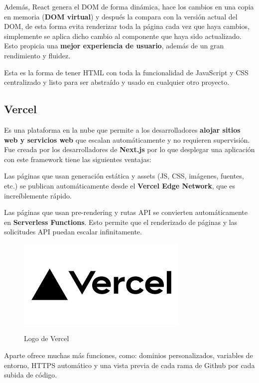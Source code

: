 \documentclass[12pt,twoside,titlepage]{report}
\begin{document}
Además, React genera el DOM de forma dinámica, hace los cambios en una copia en memoria (\textbf{DOM virtual}) y después la compara con la versión actual del DOM, de esta forma evita renderizar toda la página cada vez que haya cambios, simplemente se aplica dicho cambio al componente que haya sido actualizado. Esto propicia una \textbf{mejor experiencia de usuario}, además de un gran rendimiento y fluidez.


Esta es la forma de tener HTML con toda la funcionalidad de JavaScript y CSS centralizado y listo para ser abstraído y usado en cualquier otro proyecto.

\subsection{Vercel}

Es una plataforma en la nube que permite a los desarrolladores \textbf{alojar sitios web y servicios web} que escalan automáticamente y no requieren supervisión. Fue creada por los desarrolladores de \textbf{Next.js} por lo que desplegar una aplicación con este framework tiene las siguientes ventajas:

\begin{compactitem}
    \item Las páginas que usan generación estática y assets (JS, CSS, imágenes, fuentes, etc.) se publican automáticamente desde el \textbf{Vercel Edge Network}, que es increíblemente rápido.
    \item Las páginas que usan pre-rendering y rutas API se convierten automáticamente en \textbf{Serverless Functions}. Esto permite que el renderizado de páginas y las solicitudes API puedan escalar infinitamente.
\end{compactitem}

\begin{figure}[H]
    \centering
    \includegraphics[scale=0.5]{Vercel/Vercel}
    \label{fig:VercelLogo}
    \caption{Logo de Vercel}
\end{figure}

Aparte ofrece muchas más funciones, como: dominios personalizados, variables de entorno, HTTPS automático y una vista previa de cada rama de Github por cada subida de código.
\end{document}
